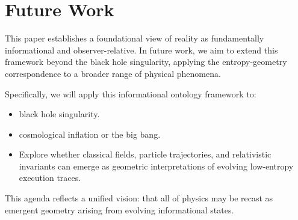\documentclass[11pt]{article}
\begin{document}
\section*{Future Work}

This paper establishes a foundational view of reality as fundamentally informational and observer-relative. In future work, we aim to extend this framework beyond the black hole singularity, applying the entropy-geometry correspondence to a broader range of physical phenomena.

Specifically, we will apply this informational ontology framework to:

\begin{itemize}
  \item black hole singularity.
  \item cosmological inflation or the big bang.
  \item Explore whether classical fields, particle trajectories, and relativistic invariants can emerge as geometric interpretations of evolving low-entropy execution traces.
\end{itemize}

This agenda reflects a unified vision: that all of physics may be recast as emergent geometry arising from evolving informational states.
\end{document}
